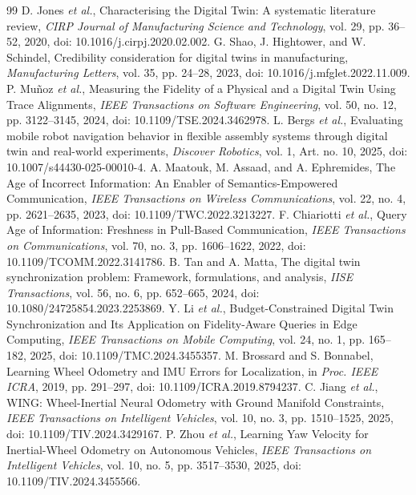 \documentclass[journal,onecolumn]{IEEEtran}
\begin{document}
\begin{thebibliography}{99}
 D. Jones \emph{et al.}, Characterising the Digital Twin: A systematic literature review, \emph{CIRP Journal of Manufacturing Science and Technology}, vol. 29, pp. 36--52, 2020, doi: 10.1016/j.cirpj.2020.02.002.
 G. Shao, J. Hightower, and W. Schindel, Credibility consideration for digital twins in manufacturing, \emph{Manufacturing Letters}, vol. 35, pp. 24--28, 2023, doi: 10.1016/j.mfglet.2022.11.009.
 P. Mu\~noz \emph{et al.}, Measuring the Fidelity of a Physical and a Digital Twin Using Trace Alignments, \emph{IEEE Transactions on Software Engineering}, vol. 50, no. 12, pp. 3122--3145, 2024, doi: 10.1109/TSE.2024.3462978.
 L. Bergs \emph{et al.}, Evaluating mobile robot navigation behavior in flexible assembly systems through digital twin and real-world experiments, \emph{Discover Robotics}, vol. 1, Art. no. 10, 2025, doi: 10.1007/s44430-025-00010-4.
 A. Maatouk, M. Assaad, and A. Ephremides, The Age of Incorrect Information: An Enabler of Semantics-Empowered Communication, \emph{IEEE Transactions on Wireless Communications}, vol. 22, no. 4, pp. 2621--2635, 2023, doi: 10.1109/TWC.2022.3213227.
 F. Chiariotti \emph{et al.}, Query Age of Information: Freshness in Pull-Based Communication, \emph{IEEE Transactions on Communications}, vol. 70, no. 3, pp. 1606--1622, 2022, doi: 10.1109/TCOMM.2022.3141786.
 B. Tan and A. Matta, The digital twin synchronization problem: Framework, formulations, and analysis, \emph{IISE Transactions}, vol. 56, no. 6, pp. 652--665, 2024, doi: 10.1080/24725854.2023.2253869.
 Y. Li \emph{et al.}, Budget-Constrained Digital Twin Synchronization and Its Application on Fidelity-Aware Queries in Edge Computing, \emph{IEEE Transactions on Mobile Computing}, vol. 24, no. 1, pp. 165--182, 2025, doi: 10.1109/TMC.2024.3455357.
 M. Brossard and S. Bonnabel, Learning Wheel Odometry and IMU Errors for Localization, in \emph{Proc. IEEE ICRA}, 2019, pp. 291--297, doi: 10.1109/ICRA.2019.8794237.
 C. Jiang \emph{et al.}, WING: Wheel-Inertial Neural Odometry with Ground Manifold Constraints, \emph{IEEE Transactions on Intelligent Vehicles}, vol. 10, no. 3, pp. 1510--1525, 2025, doi: 10.1109/TIV.2024.3429167.
 P. Zhou \emph{et al.}, Learning Yaw Velocity for Inertial-Wheel Odometry on Autonomous Vehicles, \emph{IEEE Transactions on Intelligent Vehicles}, vol. 10, no. 5, pp. 3517--3530, 2025, doi: 10.1109/TIV.2024.3455566.

\end{thebibliography}
\end{document}
